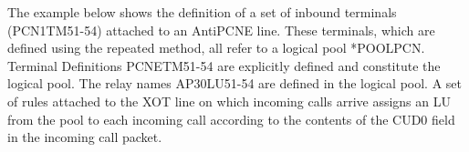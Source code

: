 \documentclass[letterpaper,10pt,english]{sphinxmanual}
\begin{document}
The example below shows the definition of a set of inbound terminals (PCN1TM51-54) attached to an AntiPCNE line. These terminals, which are defined using the repeated method, all refer to a logical pool *POOLPCN. Terminal Definitions PCNETM51-54 are explicitly defined and constitute the logical pool. The relay names AP30LU51-54 are defined in the logical pool. A set of rules attached to the XOT line on which incoming calls arrive assigns an LU from the pool to each incoming call according to the contents of the CUD0 field in the incoming call packet.

\begin{sphinxVerbatim}[commandchars=\\\{\}]
                       

\end{sphinxVerbatim}
\end{document}
